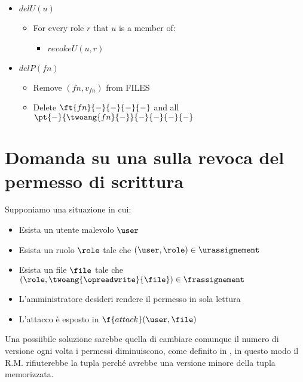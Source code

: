 {\begin{itemize}
        \item \( delU(u) \)
        \begin{itemize}
            \item For every role \(r\) that \(u\) is a member of:
            \begin{itemize}
                \item \(revokeU(u,r)\)
            \end{itemize}
        \end{itemize}

        \item \(delP(fn)\)
        \begin{itemize}
            \item Remove \((fn, v_{fn})\) from FILES
            \item Delete \( \ft{fn}{-}{-}{-}{-} \) and all \( \pt{-}{\twoang{fn}{-}}{-}{-}{-}{-} \)
        \end{itemize}

    \end{itemize}
}

\section{Domanda su una sulla revoca del permesso di scrittura}

Supponiamo una situazione in cui:
\begin{itemize}
    \item Esista un utente malevolo \(\user\)
    \item Esista un ruolo \(\role\) tale che \((\user, \role) \in \urassignement\)
    \item Esista un file \(\file\) tale che \((\role, \twoang{\opreadwrite}{\file}) \in \frassignement\)
    \item L'amministratore desideri rendere il permesso in sola lettura
    \item L'attacco è esposto in \(\f{attack}(\user, \file)\)
\end{itemize}

Una possiibile soluzione sarebbe quella di cambiare comunque il numero di versione ogni volta i permessi diminuiscono, come definito in , in questo modo il R.M. rifiuterebbe la tupla perché avrebbe una versione minore della tupla memorizzata.

